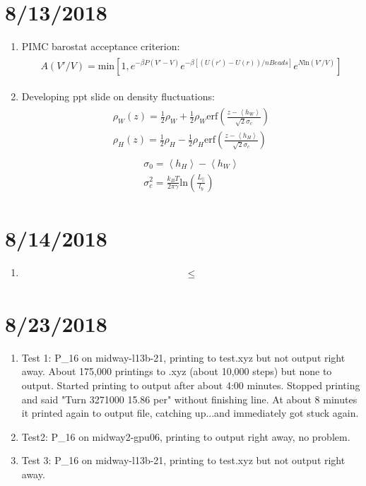 \documentclass[12pt,reqno]{amsart}
\numberwithin{equation}{section}
\begin{document}
\section{8/13/2018}
\begin{enumerate}
\item PIMC barostat acceptance criterion:
\begin{align}
\begin{split}
A(V'/V) = \text{min}[1, e^{-\beta P(V' - V)}e^{-\beta[(U(r') - U(r))/nBeads]}e^{N\text{ln}(V'/V)}]
\end{split}
\end{align}
\item Developing ppt slide on density fluctuations:
\begin{align}
\begin{split}
\rho_W(z) = \frac{1}{2}\rho_W + \frac{1}{2}\rho_W\text{erf}\left(\frac{z - \left<h_W\right>}{\sqrt{2}\sigma_c}\right) \\
\rho_H(z) = \frac{1}{2}\rho_H - \frac{1}{2}\rho_H\text{erf}\left(\frac{z - \left<h_H\right>}{\sqrt{2}\sigma_c}\right) 
\end{split}
\end{align}
\begin{align}
\begin{split}
\sigma_0 = \left<h_H\right> - \left<h_W\right> \\
\sigma_c^2 = \frac{k_BT}{2\pi\gamma}\text{ln}\left(\frac{L_{||}}{l_b}\right) 
\end{split}
\end{align}
\end{enumerate}

\section{8/14/2018}
\begin{enumerate}
\item 
\begin{align}
\begin{split}
\le
\end{split}
\end{align}
\end{enumerate}

\section{8/23/2018}
\begin{enumerate}
\item Test 1: P\_16 on midway-l13b-21, printing to test.xyz but not output right away.  About 175,000 printings to .xyz (about 10,000 steps) but none to output.   Started printing to output after about 4:00 minutes.  Stopped printing and said "Turn 3271000 15.86 per"  without finishing line.  At about 8 minutes it printed again to output file, catching up...and immediately got stuck again.  
\item Test2: P\_16 on midway2-gpu06, printing to output right away, no problem. 
\item Test 3: P\_16 on midway-l13b-21, printing to test.xyz but not output right away.   
\end{enumerate}
\end{document}
